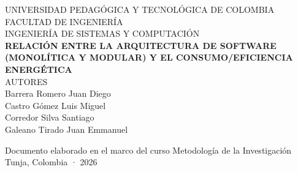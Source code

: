 \documentclass[12pt, letterpaper]{report}
\begin{document}
\begin{titlepage}
\centering
{}

{\MakeUppercase{Universidad Pedagógica y Tecnológica de Colombia}}\\[0.2cm]
{\MakeUppercase{Facultad de Ingeniería}}\\[0.2cm]
{\MakeUppercase{Ingeniería de Sistemas y Computación}}\\[2.5cm]

\textbf{\Large RELACIÓN ENTRE LA ARQUITECTURA DE SOFTWARE (MONOLÍTICA Y MODULAR) Y EL CONSUMO/EFICIENCIA ENERGÉTICA}\\[2.5cm]

\MakeUppercase{Autores}\\[0.4cm]
Barrera Romero Juan Diego\\[0.2cm]
Castro Gómez Luis Miguel\\[0.2cm]
Corredor Silva Santiago\\[0.2cm]
Galeano Tirado Juan Emmanuel

\vfill
Documento elaborado en el marco del curso Metodología de la Investigación\\[0.3cm]
Tunja, Colombia · 2026
\end{titlepage}

\tableofcontents
\clearpage
\listoftables
\clearpage
\listoffigures
\clearpage













\clearpage
{}
{}




\end{document}
